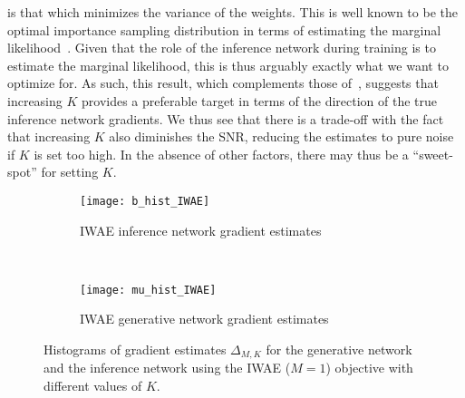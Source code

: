 is that which minimizes the variance of the weights.  This is well known to be 
the optimal importance sampling
distribution in terms of estimating the marginal likelihood~\citep{mcbook}.
Given that the role of the inference network during training is to estimate the
marginal likelihood, this is thus arguably exactly what we want to optimize for.  
As such, this result, which complements those
of~\cite{cremer2017reinterpreting}, suggests that increasing 
$K$ provides a preferable target in terms of the direction of the
true inference network gradients.  We thus see that there is a trade-off with the fact that increasing $K$ also diminishes
the \gls{SNR}, reducing the estimates to pure noise if $K$ is
set too high.   In the absence of other factors, there may thus be a ``sweet-spot'' for 
setting $K$.

\begin{figure*}[t]
	\centering
	\begin{subfigure}[b]{0.4\textwidth}
		\centering
		\texttt{[image: b\_hist\_IWAE]} %
		\caption{ \gls{IWAE} inference network gradient estimates \label{fig:snr/b_hist_iwae}}
	\end{subfigure} ~~~~~~~~~~~~~
	\begin{subfigure}[b]{0.4\textwidth}
		\centering
		\texttt{[image: mu\_hist\_IWAE]} %
		\caption{ \gls{IWAE} generative network gradient estimates \label{fig:snr/mu_hist_iwae}}
	\end{subfigure}\vspace{-6pt}
	\caption{Histograms of gradient estimates $\Delta_{M,K}$ for the generative network and 
		the inference network using the \gls{IWAE} ($M=1$)
		objective with different values of $K$.
			\vspace{-14pt}
		\label{fig:snr/hists}}
\end{figure*}

